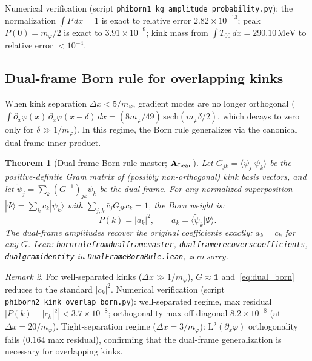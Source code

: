 \documentclass[11pt]{article}
\newtheorem{theorem}{Theorem}[section]
\theoremstyle{remark}
\newtheorem{remark}[theorem]{Remark}
\newcommand{\lean}[1]{%
  \penalty-100
  \begingroup\def\_{\textunderscore\allowbreak}\texttt{#1}\endgroup}
\newcommand{\CatAL}{\ensuremath{\textbf{A}_{\rm Lean}}}
\begin{document}
Numerical verification (script \texttt{phiborn1\_kg\_amplitude\_probability.py}):
the normalization $\int P\,dx = 1$ is exact to relative error $2.82\times10^{-13}$;
peak $P(0) = m_\varphi/2$ is exact to $3.91\times10^{-9}$; kink mass from
$\int T_{00}\,dx = 290.10\,\mathrm{MeV}$ to relative error $<10^{-4}$.

\subsection{Dual-frame Born rule for overlapping kinks}
\label{ssec:dual_frame}

When kink separation $\Delta x < 5/m_\varphi$, gradient modes are no longer
orthogonal ($\int\partial_x\varphi(x)\,\partial_x\varphi(x-\delta)\,dx =
(8m_\varphi/49)\,\mathrm{sech}(m_\varphi\delta/2)$, which decays to zero only
for $\delta\gg 1/m_\varphi$).  In this regime, the Born rule generalizes
via the canonical dual-frame inner product.

\begin{theorem}[Dual-frame Born rule master; $\CatAL$]
  \label{thm:dual_frame}
  Let $G_{jk} = \langle\psi_j|\psi_k\rangle$ be the positive-definite Gram matrix
  of (possibly non-orthogonal) kink basis vectors, and let
  $\tilde\psi_j = \sum_k (G^{-1})_{jk}\psi_k$ be the dual frame.
  For any normalized superposition $|\Psi\rangle = \sum_k c_k|\psi_k\rangle$
  with $\sum_{j,k}\bar c_j G_{jk} c_k = 1$, the Born weight is:
  \begin{equation}
    P(k) = |a_k|^2,
    \qquad a_k = \langle\tilde\psi_k|\Psi\rangle.
    \label{eq:dual_born}
  \end{equation}
  The dual-frame amplitudes recover the original coefficients exactly:
  $a_k = c_k$ for any $G$.
  Lean: \lean{born\_rule\_from\_dual\_frame\_master},
  \lean{dual\_frame\_recovers\_coefficients},
  \lean{dual\_gram\_identity} in \lean{DualFrameBornRule.lean}, zero sorry.
\end{theorem}

\begin{remark}
  For well-separated kinks ($\Delta x\gg 1/m_\varphi$), $G\approx\mathbf{1}$
  and~\eqref{eq:dual_born} reduces to the standard $|c_k|^2$.
  Numerical verification (script \texttt{phiborn2\_kink\_overlap\_born.py}):
  well-separated regime, max residual $|P(k)-|c_k|^2|<3.7\times10^{-8}$;
  orthogonality max off-diagonal $8.2\times10^{-8}$ (at $\Delta x=20/m_\varphi$).
  Tight-separation regime ($\Delta x=3/m_\varphi$): L$^2(\partial_x\varphi)$
  orthogonality fails ($0.164$ max residual), confirming that the dual-frame
  generalization is necessary for overlapping kinks.
\end{remark}
\end{document}

